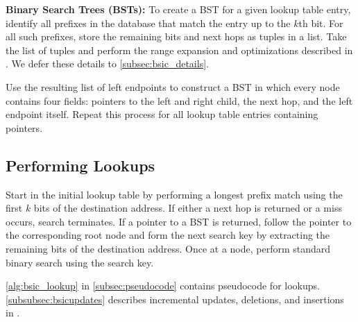 {\bf Binary Search Trees (BSTs):}
To create a BST for a given lookup table entry, identify all prefixes in the database that match the entry up to the $k$th bit. For all such prefixes, store the remaining bits and next hops as tuples in a list. Take the list of tuples and perform the range expansion and optimizations described in \cite{dxr}. We defer these details to \cref{subsec:bsic_details}.

Use the resulting list of left endpoints to construct a BST in which every node contains four fields: pointers to the left and right child, the next hop, and the left endpoint itself. Repeat this process for all lookup table entries containing pointers.

\subsection{Performing Lookups} \label{subsec:bsic_lookups}
Start in the initial lookup table by performing a longest prefix match using the first $k$ bits of the destination address. If either a next hop is returned or a miss occurs, search terminates. If a pointer to a BST is returned, follow the pointer to the corresponding root node and form the next search key by extracting the remaining bits of the destination address. Once at a node, perform standard binary search using the search key.

\cref{alg:bsic_lookup} in \cref{subsec:pseudocode} contains pseudocode for \bsic lookups. \cref{subsubsec:bsicupdates} describes incremental updates, deletions, and insertions in \bsic.